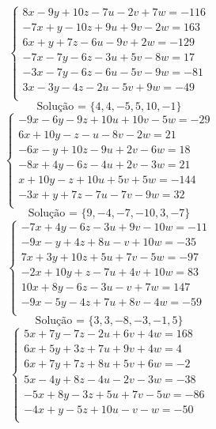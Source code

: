 \documentclass[12pt,oneside,a4paper]{article}
\begin{document}
\vspace{\baselineskip}
\begin{equation*}
\begin{cases}
8x-9y+10z-7u-2v+7w=-116 \\
-7x+y-10z+9u+9v-2w=163 \\
6x+y+7z-6u-9v+2w=-129 \\
-7x-7y-6z-3u+5v-8w=17 \\
-3x-7y-6z-6u-5v-9w=-81 \\
3x-3y-4z-2u-5v+9w=-49 \\
\end{cases}
\end{equation*}
\begin{equation*}
\text{Solução = }\{4,4,-5,5,10,-1\}
\end{equation*}
\vspace{\baselineskip}
\begin{equation*}
\begin{cases}
-9x-6y-9z+10u+10v-5w=-29 \\
6x+10y-z-u-8v-2w=21 \\
-6x-y+10z-9u+2v-6w=18 \\
-8x+4y-6z-4u+2v-3w=21 \\
x+10y-z+10u+5v+5w=-144 \\
-3x+y+7z-7u-7v-9w=32 \\
\end{cases}
\end{equation*}
\begin{equation*}
\text{Solução = }\{9,-4,-7,-10,3,-7\}
\end{equation*}
\vspace{\baselineskip}
\begin{equation*}
\begin{cases}
-7x+4y-6z-3u+9v-10w=-11 \\
-9x-y+4z+8u-v+10w=-35 \\
7x+3y+10z+5u+7v-5w=-97 \\
-2x+10y+z-7u+4v+10w=83 \\
10x+8y-6z-3u-v+7w=147 \\
-9x-5y-4z+7u+8v-4w=-59 \\
\end{cases}
\end{equation*}
\begin{equation*}
\text{Solução = }\{3,3,-8,-3,-1,5\}
\end{equation*}
\vspace{\baselineskip}
\begin{equation*}
\begin{cases}
5x+7y-7z-2u+6v+4w=168 \\
6x+5y+3z+7u+9v+4w=4 \\
6x+7y+7z+8u+5v+6w=-2 \\
5x-4y+8z-4u-2v-3w=-38 \\
-5x+8y-3z+5u+7v-5w=-86 \\
-4x+y-5z+10u-v-w=-50 \\
\end{cases}
\end{equation*}
\end{document}
